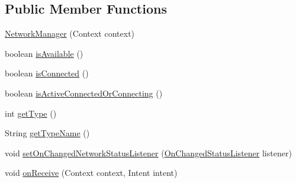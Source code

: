 \subsection*{Public Member Functions}
\begin{DoxyCompactItemize}
\item 
\hyperlink{classcom_1_1toast_1_1android_1_1gamebase_1_1base_1_1_network_manager_aa4a02e3eec7c46f6b60008bd7682e0e1}{Network\+Manager} (Context context)
\item 
boolean \hyperlink{classcom_1_1toast_1_1android_1_1gamebase_1_1base_1_1_network_manager_a62dd431bfacf906687637b7700f6ad2c}{is\+Available} ()
\item 
boolean \hyperlink{classcom_1_1toast_1_1android_1_1gamebase_1_1base_1_1_network_manager_afbf4768f0408a85337dbb9f1413d611a}{is\+Connected} ()
\item 
boolean \hyperlink{classcom_1_1toast_1_1android_1_1gamebase_1_1base_1_1_network_manager_a56e48cfbc5863365a1e133df51c0ceb3}{is\+Active\+Connected\+Or\+Connecting} ()
\item 
int \hyperlink{classcom_1_1toast_1_1android_1_1gamebase_1_1base_1_1_network_manager_aec389cbe6ac7aff8ce7196e7dbc007df}{get\+Type} ()
\item 
String \hyperlink{classcom_1_1toast_1_1android_1_1gamebase_1_1base_1_1_network_manager_a9f0f20d4149a5730b858d8faff891de4}{get\+Type\+Name} ()
\item 
void \hyperlink{classcom_1_1toast_1_1android_1_1gamebase_1_1base_1_1_network_manager_a1523a830067dcd68416469f34b750527}{set\+On\+Changed\+Network\+Status\+Listener} (\hyperlink{interfacecom_1_1toast_1_1android_1_1gamebase_1_1base_1_1_network_manager_1_1_on_changed_status_listener}{On\+Changed\+Status\+Listener} listener)
\item 
void \hyperlink{classcom_1_1toast_1_1android_1_1gamebase_1_1base_1_1_network_manager_afe2ab6137f59f9ff640f1e3b74080ad7}{on\+Receive} (Context context, Intent intent)
\end{DoxyCompactItemize}
